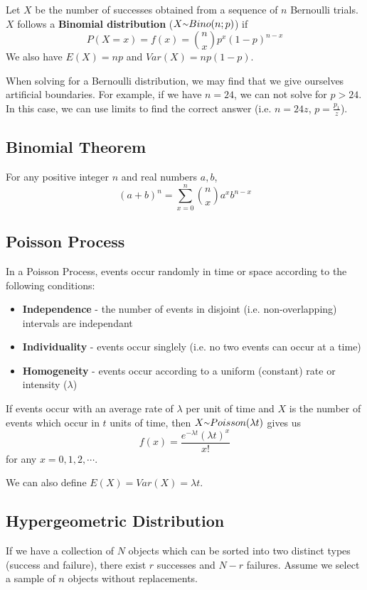 \documentclass[12pt]{article}
\begin{document}
Let $X$ be the number of successes obtained from a sequence of $n$ Bernoulli trials. $X$ follows a {\bf Binomial distribution} ($X \ttilde Bino(n; p)$) if \[ P(X = x) = f(x) = {n \choose x} p^x (1-p)^{n-x} \] We also have $E(X) = np$ and $Var(X) = np(1-p)$.

When solving for a Bernoulli distribution, we may find that we give ourselves artificial boundaries. For example, if we have $n = 24$, we can not solve for $p > 24$. In this case, we can use limits to find the correct answer (i.e. $n = 24z$, $p = \frac{p_1}{z}$).

\subsection*{Binomial Theorem}
For any positive integer $n$ and real numbers $a,b$, \[ (a+b)^n = \sum_{x=0}^n {n \choose x} a^xb^{n-x} \]

\subsection*{Poisson Process}
In a Poisson Process, events occur randomly in time or space according to the following conditions:
\begin{itemize}
\item {\bf Independence} - the number of events in disjoint (i.e. non-overlapping) intervals are independant
\item {\bf Individuality} - events occur singlely (i.e. no two events can occur at a time)
\item {\bf Homogeneity} - events occur according to a uniform (constant) rate or intensity ($\lambda$)
\end{itemize}

If events occur with an average rate of $\lambda$ per unit of time and $X$ is the number of events which occur in $t$ units of time, then $X \ttilde Poisson(\lambda t)$ gives us \[ f(x) = \frac{e^{-\lambda t} (\lambda t)^x}{x!} \] for any $x = 0, 1, 2, \cdots$.

We can also define $E(X) = Var(X) = \lambda t$.

\subsection*{Hypergeometric Distribution}
If we have a collection of $N$ objects which can be sorted into two distinct types (success and failure), there exist $r$ successes and $N - r$ failures. Assume we select a sample of $n$ objects without replacements.
\end{document}
